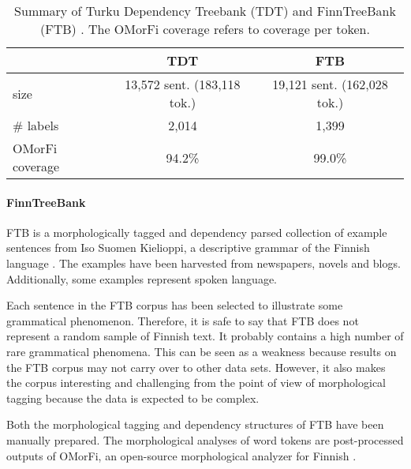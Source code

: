 \begin{table}[htb!]
\begin{center}
\begin{tabular}{lcc} 
 & TDT & FTB \\
\hline
size & 13,572 sent. (183,118 tok.) & 19,121 sent. (162,028 tok.) \\
\# labels & 2,014 & 1,399 \\
OMorFi coverage & 94.2\% & 99.0\% \\
\end{tabular}
\end{center}
\caption{Summary of Turku Dependency Treebank (TDT) \citep{Haverinen2013} and FinnTreeBank (FTB) \citep{Voutilainen2011}. The OMorFi coverage refers to coverage per token.}
\label{tab:data} 
\end{table}

\paragraph{FinnTreeBank}
FTB is a morphologically tagged and dependency parsed collection of
example sentences from Iso Suomen Kielioppi, a descriptive grammar of
the Finnish language \citep{Hakulinen2004}. The examples have been
harvested from newspapers, novels and blogs. Additionally, some
examples represent spoken language. 

Each sentence in the FTB corpus has been selected to illustrate some
grammatical phenomenon. Therefore, it is safe to say that FTB does not
represent a random sample of Finnish text. It probably contains a high
number of rare grammatical phenomena. This can be seen as a weakness
because results on the FTB corpus may not carry over to other data
sets. However, it also makes the corpus interesting and challenging
from the point of view of morphological tagging because the data is
expected to be complex.

Both the morphological tagging and dependency structures of FTB have
been manually prepared.  The morphological analyses of word tokens are
post-processed outputs of OMorFi, an open-source morphological
analyzer for Finnish
\citep{Pirinen2011}. %

